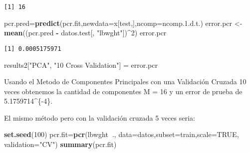 \documentclass[]{article}
\newenvironment{Shaded}{\begin{snugshade}}{\end{snugshade}}
\newcommand{\KeywordTok}[1]{\textcolor[rgb]{0.13,0.29,0.53}{\textbf{#1}}}
\newcommand{\DataTypeTok}[1]{\textcolor[rgb]{0.13,0.29,0.53}{#1}}
\newcommand{\DecValTok}[1]{\textcolor[rgb]{0.00,0.00,0.81}{#1}}
\newcommand{\FloatTok}[1]{\textcolor[rgb]{0.00,0.00,0.81}{#1}}
\newcommand{\StringTok}[1]{\textcolor[rgb]{0.31,0.60,0.02}{#1}}
\newcommand{\OtherTok}[1]{\textcolor[rgb]{0.56,0.35,0.01}{#1}}
\newcommand{\OperatorTok}[1]{\textcolor[rgb]{0.81,0.36,0.00}{\textbf{#1}}}
\newcommand{\NormalTok}[1]{#1}
\begin{document}
\begin{verbatim}
[1] 16
\end{verbatim}

\begin{Shaded}
\begin{Highlighting}[]
\NormalTok{pcr.pred=}\KeywordTok{predict}\NormalTok{(pcr.fit,}\DataTypeTok{newdata=}\NormalTok{x[test,],}\DataTypeTok{ncomp=}\NormalTok{ncomp.}\FloatTok{1.}\NormalTok{d.t.)}
\NormalTok{error.pcr <-}\StringTok{ }\KeywordTok{mean}\NormalTok{((pcr.pred }\OperatorTok{-}\StringTok{ }\NormalTok{datos.test[, }\StringTok{"lbwght"}\NormalTok{])}\OperatorTok{^}\DecValTok{2}\NormalTok{)}
\NormalTok{error.pcr}
\end{Highlighting}
\end{Shaded}

\begin{verbatim}
[1] 0.0005175971
\end{verbatim}

\begin{Shaded}
\begin{Highlighting}[]
\NormalTok{results2[}\StringTok{"PCA"}\NormalTok{, }\StringTok{"10 Cross Validation"}\NormalTok{] =}\StringTok{ }\NormalTok{error.pcr}
\end{Highlighting}
\end{Shaded}

Usando el Metodo de Componentes Principales con una Validación Cruzada
10 veces obtenemos la cantidad de componentes M = 16 y un error de
prueba de 5.1759714\^{}\{-4\}.

El mismo método pero con la validación cruzada 5 veces seria:

\begin{Shaded}
\begin{Highlighting}[]
\KeywordTok{set.seed}\NormalTok{(}\DecValTok{100}\NormalTok{)}
\NormalTok{pcr.fit=}\KeywordTok{pcr}\NormalTok{(lbwght}\OperatorTok{~}\NormalTok{., }\DataTypeTok{data=}\NormalTok{datos,}\DataTypeTok{subset=}\NormalTok{train,}\DataTypeTok{scale=}\OtherTok{TRUE}\NormalTok{, }\DataTypeTok{validation=}\StringTok{"CV"}\NormalTok{)}
\KeywordTok{summary}\NormalTok{(pcr.fit)}
\end{Highlighting}
\end{Shaded}
\end{document}
